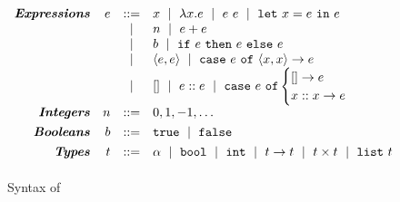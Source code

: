 \begin{figure}
$$
\begin{array}{rrcl}
\emphbf{Expressions}
  & e & ::=    & x \spmid \efun{x}{e} \spmid \eapp{e}{e} \spmid \elet{x}{e}{e} \\
  &   & \spmid & n \spmid \eplus{e}{e}\\
  &   & \spmid & b \spmid \eif{e}{e}{e} \\
  &   & \spmid & \epair{e}{e} \spmid \epcase{e}{x}{x}{e} \\
  &   & \spmid & \enil \spmid \econs{e}{e} \spmid \ecase{e}{e}{x}{x}{e} \\[0.05in]

\emphbf{Integers}
  & n & ::= &  0, 1, -1, \ldots \\[0.05in]

\emphbf{Booleans}
  & b & ::= &  \etrue \spmid \efalse \\[0.05in]

\emphbf{Types}
  & t & ::= & \alpha \spmid \tbool \spmid \tint \spmid \tfun{t}{t} \spmid \tprod{t}{t} \spmid \tlist{t} \\[0.05in]
\end{array}
$$
\caption{Syntax of \lang}
\label{fig:syntax}
\end{figure}
